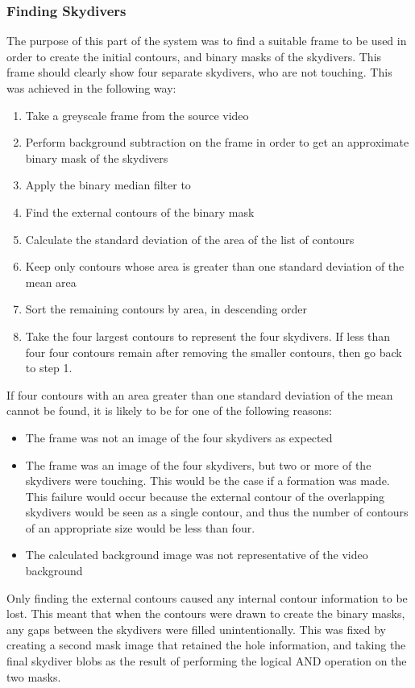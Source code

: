 \documentclass[a4paper, 12pt]{article}
\begin{document}
	\subsubsection{Finding Skydivers}
	The purpose of this part of the system was to find a suitable frame to be used in order to create the initial contours, and binary masks of the 			skydivers.
	This frame should clearly show four separate skydivers, who are not touching.
	This was achieved in the following way:
	\begin{enumerate}
		\item Take a greyscale frame from the source video 
		\item Perform background subtraction on the frame in order to get an approximate binary mask of the skydivers
		\item Apply the binary median filter to
		\item Find the external contours of the binary mask
		\item Calculate the standard deviation of the area of the list of contours
		\item Keep only contours whose area is greater than one standard deviation of the mean area
		\item Sort the remaining contours by area, in descending order
		\item Take the four largest contours to represent the four skydivers.
	If less than four four contours remain after removing the smaller contours, then go back to step 1.
	\end{enumerate}
	If four contours with an area greater than one standard deviation of the mean cannot be found, it is likely to be for one of the following reasons:
	\begin{itemize}
		\item The frame was not an image of the four skydivers as expected
		\item The frame was an image of the four skydivers, but two or more of the skydivers were touching.
		This would be the case if a formation was made. This failure would occur because the external contour of the overlapping skydivers would be seen as 		a single contour, and thus the number of contours of an appropriate size would be less than four.
		\item The calculated background image was not representative of the video background
	\end{itemize}
	Only finding the external contours caused any internal contour information to be lost.
	This meant that when the contours were drawn to create the binary masks, any gaps between the skydivers were filled unintentionally.
	This was fixed by creating a second mask image that retained the hole information, and taking the final
	skydiver blobs as the result of performing the logical AND operation on the two masks.
%
\end{document}
